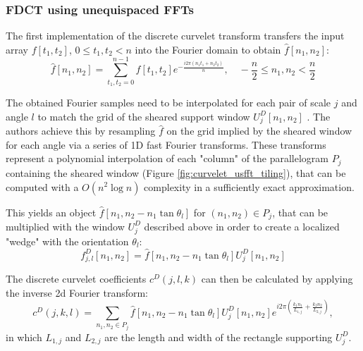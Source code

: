 \subsubsection{FDCT using unequispaced FFTs}

The first implementation of the discrete curvelet transform transfers the input
array $f[t_1, t_2]$, $0 \leq t_1, t_2 < n$ into the Fourier domain to obtain
$\hat{f}[n_1, n_2]$:
\begin{equation*}
    \hat{f}[n_1, n_2] = \sum_{t_1, t_2 = 0}^{n - 1} f[t_1, t_2] e^{- \frac{i 2 \pi (n_1 t_1 + n_2 t_2)}{n}}, \quad -\frac{n}{2} \leq n_1, n_2 < \frac{n}{2}
\end{equation*}

The obtained Fourier samples need to be interpolated for each pair of scale $j$
and angle $l$ to match the grid of the sheared support window $U_j^D[n_1, n_2]$
. The authors achieve this by resampling $\hat{f}$ on the grid
implied by the sheared window for each angle via a series of 1D fast Fourier
transforms.  These transforms represent a polynomial interpolation of each
"column" of the parallelogram $P_j$ containing the sheared window (Figure
\ref{fig:curvelet_usfft_tiling}), that can be computed with a $O(n^2 \log n)$
complexity in a sufficiently exact approximation.

This yields an object $\hat{f}[n_1, n_2 - n_1 \tan \theta_l]$ for $(n_1, n_2)
\in P_j$, that can be multiplied with the window $U_j^D$ described above in
order to create a localized "wedge" with the orientation $\theta_l$:
\begin{equation*}
    f_{j, l}^D[n_1, n_2] = \hat{f}[n_1, n_2 - n_1 \tan \theta_l] U_j^D[n_1, n_2]
\end{equation*}

The discrete curvelet coefficients $c^D(j, l, k)$ can then be calculated by
applying the inverse 2d Fourier transform:
\begin{equation*}
    c^D(j, k, l) = \sum_{n_1, n_2 \in P_j} \hat{f}[n_1, n_2 - n_1 \tan \theta_l] U_j^D[n_1, n_2] e^{i 2 \pi (\frac{k_1 n_1}{L_{1, j}} + \frac{k_2 n_2}{L_{2,j}})},
\end{equation*}
in which $L_{1, j}$ and $L_{2, j}$ are the length and width of the rectangle supporting $U_j^D$.

